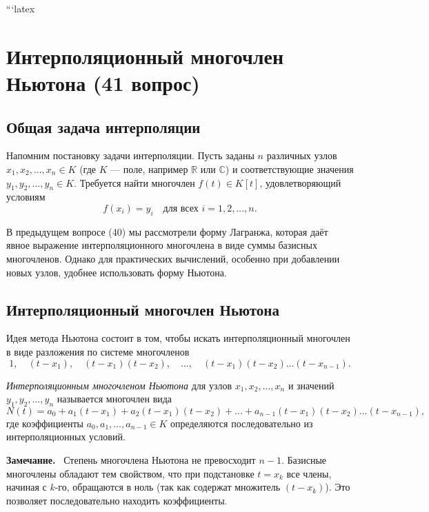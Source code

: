 \documentclass[a4paper,12pt]{article}
\newcommand{\myremark}{\textbf{Замечание.}\ }
\theoremstyle{definition}
\theoremstyle{plain}
\theoremstyle{remark}
\begin{document}
	```latex
	\newpage
	\section{Интерполяционный многочлен Ньютона (41 вопрос)}
	
	\subsection{Общая задача интерполяции}
	
	Напомним постановку задачи интерполяции. Пусть заданы \( n \) различных узлов \( x_1, x_2, \dots, x_n \in K \) (где \( K \) — поле, например \( \mathbb{R} \) или \( \mathbb{C} \)) и соответствующие значения \( y_1, y_2, \dots, y_n \in K \). Требуется найти многочлен \( f(t) \in K[t] \), удовлетворяющий условиям
	\[
	f(x_i) = y_i \quad \text{для всех } i = 1, 2, \dots, n.
	\]
	
	В предыдущем вопросе (40) мы рассмотрели форму Лагранжа, которая даёт явное выражение интерполяционного многочлена в виде суммы базисных многочленов. Однако для практических вычислений, особенно при добавлении новых узлов, удобнее использовать форму Ньютона.
	
	\subsection{Интерполяционный многочлен Ньютона}
	
	Идея метода Ньютона состоит в том, чтобы искать интерполяционный многочлен в виде разложения по системе многочленов
	\[
	1, \quad (t - x_1), \quad (t - x_1)(t - x_2), \quad \dots, \quad (t - x_1)(t - x_2)\dots(t - x_{n-1}).
	\]
	
	\begin{tcolorbox}[colback=blue!5, colframe=blue!40!black, title=Определение]
		\textit{Интерполяционным многочленом Ньютона} для узлов \( x_1, x_2, \dots, x_n \) и значений \( y_1, y_2, \dots, y_n \) называется многочлен вида
		\[
		N(t) = a_0 + a_1(t - x_1) + a_2(t - x_1)(t - x_2) + \dots + a_{n-1}(t - x_1)(t - x_2)\dots(t - x_{n-1}),
		\]
		где коэффициенты \( a_0, a_1, \dots, a_{n-1} \in K \) определяются последовательно из интерполяционных условий.
	\end{tcolorbox}
	
	\myremark
	Степень многочлена Ньютона не превосходит \( n-1 \). Базисные многочлены обладают тем свойством, что при подстановке \( t = x_k \) все члены, начиная с \( k \)-го, обращаются в ноль (так как содержат множитель \( (t - x_k) \)). Это позволяет последовательно находить коэффициенты.
	
\end{document}
